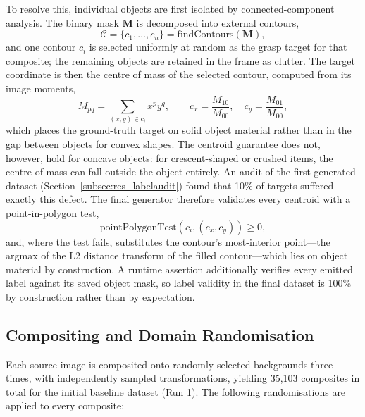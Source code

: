 To resolve this, individual objects are first isolated by connected-component analysis. The binary mask $\mathbf{M}$ is decomposed into external contours,
\begin{equation}
    \mathcal{C} = \{c_1, \dots, c_n\} = \mathrm{findContours}(\mathbf{M}),
\end{equation}
and one contour $c_i$ is selected uniformly at random as the grasp target for that composite; the remaining objects are retained in the frame as clutter. The target coordinate is then the centre of mass of the selected contour, computed from its image moments,
\begin{equation}
    M_{pq} = \sum_{(x,y) \in c_i} x^{p} y^{q}, \qquad
    c_x = \frac{M_{10}}{M_{00}}, \quad c_y = \frac{M_{01}}{M_{00}},
\end{equation}
which places the ground-truth target on solid object material rather than in
the gap between objects for convex shapes. The centroid guarantee does not,
however, hold for concave objects: for crescent-shaped or crushed items, the
centre of mass can fall outside the object entirely. An audit of the first
generated dataset (Section~\ref{subsec:res_labelaudit}) found that 10\% of
targets suffered exactly this defect. The final generator therefore validates
every centroid with a point-in-polygon test,
\begin{equation}
    \mathrm{pointPolygonTest}(c_i, (c_x, c_y)) \geq 0,
\end{equation}
and, where the test fails, substitutes the contour's most-interior point---the
argmax of the L2 distance transform of the filled contour---which lies on
object material by construction. A runtime assertion additionally verifies
every emitted label against its saved object mask, so label validity in the
final dataset is 100\% by construction rather than by expectation.

\subsection{Compositing and Domain Randomisation}
\label{subsec:compositing}

Each source image is composited onto randomly selected backgrounds three times, with independently sampled transformations, yielding 35{,}103 composites in total for the initial baseline dataset (Run 1). The following randomisations are applied to every composite:

